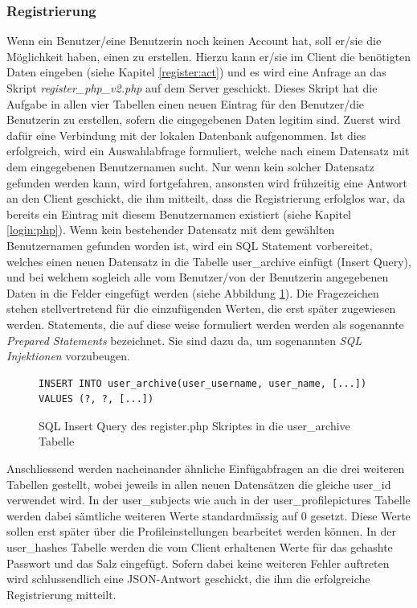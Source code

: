\documentclass[a4paper,11pt]{report}
\begin{document}
					\subsubsection{Registrierung}%
					Wenn ein Benutzer/eine Benutzerin noch keinen Account hat, soll er/sie die Möglichkeit haben, einen zu erstellen. Hierzu kann er/sie im Client die benötigten Daten eingeben (siehe Kapitel \ref{register:act}) und es wird eine Anfrage an das Skript \emph{register\_php\_v2.php} auf dem Server geschickt. Dieses Skript hat die Aufgabe in allen vier Tabellen einen neuen Eintrag für den Benutzer/die Benutzerin zu erstellen, sofern die eingegebenen Daten legitim sind. Zuerst wird dafür eine Verbindung mit der lokalen Datenbank aufgenommen. Ist dies erfolgreich, wird ein Auswahlabfrage formuliert, welche nach einem Datensatz mit dem eingegebenen Benutzernamen sucht. Nur wenn kein solcher Datensatz gefunden werden kann, wird fortgefahren, ansonsten wird frühzeitig eine Antwort an den Client geschickt, die ihm mitteilt, dass die Registrierung erfolglos war, da bereits ein Eintrag mit diesem Benutzernamen existiert (siehe Kapitel \ref{login:php}). Wenn kein bestehender Datensatz mit dem gewählten Benutzernamen gefunden worden ist, wird ein SQL Statement vorbereitet, welches einen neuen Datensatz in die Tabelle user\_archive einfügt (Insert Query), und bei welchem sogleich alle vom Benutzer/von der Benutzerin angegebenen Daten in die Felder eingefügt werden (siehe Abbildung \ref{SQL:INSERT}). Die Fragezeichen stehen stellvertretend für die einzufügenden Werten, die erst später zugewiesen werden. Statements, die auf diese weise formuliert werden werden als sogenannte \emph{Prepared Statements} bezeichnet. Sie sind dazu da, um sogenannten \emph{SQL Injektionen} vorzubeugen.\cite{preparedstatement}
				\begin{figure} 
					\begin{center}
					\begin{verbatim}
INSERT INTO user_archive(user_username, user_name, [...]) VALUES (?, ?, [...])
					\end{verbatim}
					\caption{SQL Insert Query des register.php Skriptes in die user\_archive Tabelle}
					\label{SQL:INSERT}
				\end{center}
				\end{figure}
			
					Anschliessend werden nacheinander ähnliche Einfügabfragen an die drei weiteren Tabellen gestellt, wobei jeweils in allen neuen Datensätzen die gleiche user\_id verwendet wird. In der user\_subjects wie auch in der user\_profilepictures Tabelle werden dabei sämtliche weiteren Werte standardmässig auf 0 gesetzt. Diese Werte sollen erst später über die Profileinstellungen bearbeitet werden können. In der user\_hashes Tabelle werden die vom Client erhaltenen Werte für das gehashte Passwort und das Salz eingefügt. Sofern dabei keine weiteren Fehler auftreten wird schlussendlich eine JSON-Antwort geschickt, die ihm die erfolgreiche Registrierung mitteilt.
		
\end{document}

